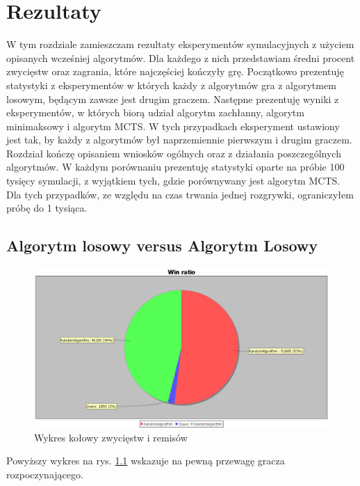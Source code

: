 \chapter{Rezultaty}
\label{cha:rozdz5}

W tym rozdziale zamieszczam rezultaty eksperymentów symulacyjnych z użyciem opisanych wcześniej algorytmów. Dla każdego z nich przedstawiam średni procent zwycięstw oraz zagrania, które najczęściej kończyły grę. Początkowo prezentuję statystyki z eksperymentów w których każdy z algorytmów gra z algorytmem losowym, będącym zawsze jest drugim graczem. Następne prezentuję wyniki z eksperymentów, w których biorą udział algorytm zachłanny, algorytm minimaksowy i algorytm MCTS. W tych przypadkach eksperyment ustawiony jest tak, by każdy z algorytmów był naprzemiennie pierwszym i drugim graczem. Rozdział kończę opisaniem wniosków ogólnych oraz z działania poszczególnych algorytmów.
W każdym porównaniu prezentuję statystyki oparte na próbie 100 tysięcy  symulacji, z wyjątkiem tych, gdzie porównywany jest algorytm MCTS. Dla tych przypadków, ze względu na czas trwania jednej rozgrywki, ograniczyłem próbę do 1 tysiąca.

\section{Algorytm losowy versus Algorytm Losowy}

\begin{figure}[H]
	\centering
	\includegraphics[width=\textwidth]{Resources/RVsR/RVsRwin.PNG}
	\caption{Wykres kołowy zwycięstw i remisów} 
	\label{fig:RVsRwin}
\end{figure}

Powyższy wykres na rys. \ref{fig:RVsRwin} wskazuje na pewną przewagę gracza rozpoczynającego.

